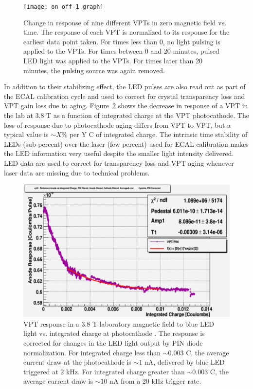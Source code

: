 \documentclass[dissertation.tex]{subfiles}
\begin{document}
\begin{figure}
	\centering
	\texttt{[image: on\_off-1\_graph]}
	\caption{Change in response of nine different VPTs in zero magnetic field vs. time.  The response of each VPT is normalized to its response for the earliest data point taken.  For times less than 0, no light pulsing is applied to the VPTs.  For times between 0 and 20 minutes, pulsed LED light was applied to the VPTs.  For times later than 20 minutes, the pulsing source was again removed.}
	\label{fig:VPT_gain_changes}
\end{figure}

In addition to their stabilizing effect, the LED pulses are also read out as part of the ECAL calibration cycle and used to correct for crystal transparency loss and VPT gain loss due to aging.  Figure~\ref{fig:VPT_aging} shows the decrease in response of a VPT in the lab at 3.8 T as a function of integrated charge at the VPT photocathode.  The loss of response due to photocathode aging differs from VPT to VPT, but a typical value is $\sim X\%$ per Y C of integrated charge.  The intrinsic time stability of LEDs (sub-percent) over the laser (few percent) used for ECAL calibration makes the LED information very useful despite the smaller light intensity delivered.  LED data are used to correct for transparency loss and VPT aging whenever laser data are missing due to technical problems.

\begin{figure}
	\centering
	\includegraphics[scale=0.375]{VPT_aging}
	\caption{VPT response in a 3.8 T laboratory magnetic field to blue LED light vs. integrated charge at photocathode \cite{Wood}.  The response is corrected for changes in the LED light output by PIN diode normalization.  For integrated charge less than $\sim0.003$ C, the average current draw at the photocathode is $\sim1$ nA, delivered by blue LED triggered at 2 kHz.  For integrated charge greater than $\sim0.003$ C, the average current draw is $\sim10$ nA from a 20 kHz trigger rate.}
	\label{fig:VPT_aging}
\end{figure}
\end{document}
